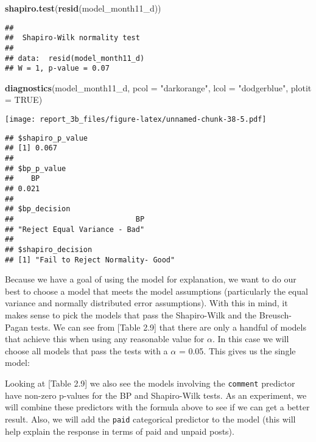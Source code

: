 \documentclass[
]{article}
\newenvironment{Shaded}{\begin{snugshade}}{\end{snugshade}}
\newcommand{\DataTypeTok}[1]{\textcolor[rgb]{0.13,0.29,0.53}{#1}}
\newcommand{\KeywordTok}[1]{\textcolor[rgb]{0.13,0.29,0.53}{\textbf{#1}}}
\newcommand{\NormalTok}[1]{#1}
\newcommand{\OtherTok}[1]{\textcolor[rgb]{0.56,0.35,0.01}{#1}}
\newcommand{\StringTok}[1]{\textcolor[rgb]{0.31,0.60,0.02}{#1}}
\begin{document}
\begin{Shaded}
\begin{Highlighting}[]
\KeywordTok{shapiro.test}\NormalTok{(}\KeywordTok{resid}\NormalTok{(model_month11_d))}
\end{Highlighting}
\end{Shaded}

\begin{verbatim}
## 
##  Shapiro-Wilk normality test
## 
## data:  resid(model_month11_d)
## W = 1, p-value = 0.07
\end{verbatim}

\begin{Shaded}
\begin{Highlighting}[]
\KeywordTok{diagnostics}\NormalTok{(model_month11_d, }\DataTypeTok{pcol =} \StringTok{"darkorange"}\NormalTok{, }\DataTypeTok{lcol =} \StringTok{"dodgerblue"}\NormalTok{, }\DataTypeTok{plotit =} \OtherTok{TRUE}\NormalTok{)}
\end{Highlighting}
\end{Shaded}

\texttt{[image: report\_3b\_files/figure-latex/unnamed-chunk-38-5.pdf]}

\begin{verbatim}
## $shapiro_p_value
## [1] 0.067
## 
## $bp_p_value
##    BP 
## 0.021 
## 
## $bp_decision
##                            BP 
## "Reject Equal Variance - Bad" 
## 
## $shapiro_decision
## [1] "Fail to Reject Normality- Good"
\end{verbatim}

Because we have a goal of using the model for explanation, we want to do
our best to choose a model that meets the model assumptions
(particularly the equal variance and normally distributed error
assumptions). With this in mind, it makes sense to pick the models that
pass the Shapiro-Wilk and the Breusch-Pagan tests. We can see from
{[}Table 2.9{]} that there are only a handful of models that achieve
this when using any reasonable value for \(\alpha\). In this case we
will choose all models that pass the tests with a \(\alpha\) = 0.05.
This gives us the single model:

Looking at {[}Table 2.9{]} we also see the models involving the
\texttt{comment} predictor have non-zero p-values for the BP and
Shapiro-Wilk tests. As an experiment, we will combine these predictors
with the formula above to see if we can get a better result. Also, we
will add the \texttt{paid} categorical predictor to the model (this will
help explain the response in terms of paid and unpaid posts).
\end{document}
